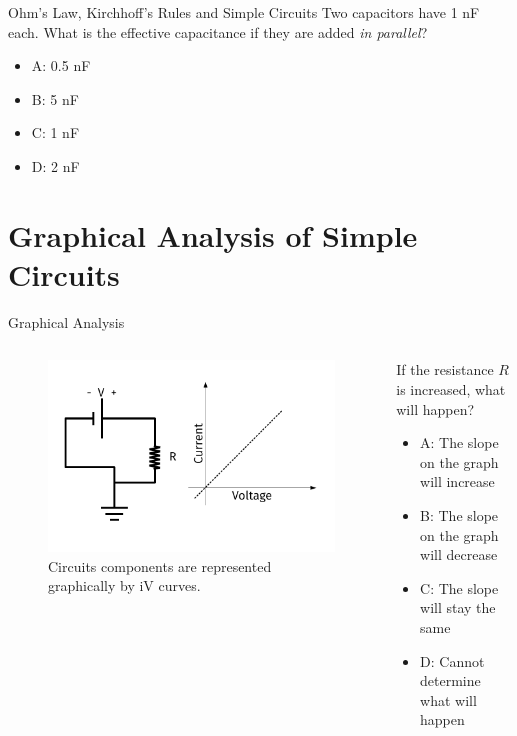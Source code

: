 \documentclass{beamer}
\begin{document}
\begin{frame}{Ohm's Law, Kirchhoff's Rules and Simple Circuits}
Two capacitors have 1 nF each.  What is the effective capacitance if they are added \textit{in parallel}?
\begin{itemize}
\item A: 0.5 nF
\item B: 5 nF
\item C: 1 nF
\item D: 2 nF
\end{itemize}
\end{frame}

\section{Graphical Analysis of Simple Circuits}

\begin{frame}{Graphical Analysis}
\begin{columns}[T]
\begin{column}{0.5\textwidth}
\begin{figure}
\centering
\includegraphics[width=\textwidth,trim=0.5cm 0cm 1cm 0cm,clip=true]{figures/iVCurve.pdf}
\caption{\label{fig:iVCurve1} Circuits components are represented graphically by iV curves.}
\end{figure}
\end{column}
\begin{column}{0.5\textwidth}
\small
If the resistance $R$ is increased, what will happen?
\begin{itemize}
\item A: The slope on the graph will increase
\item B: The slope on the graph will decrease
\item C: The slope will stay the same
\item D: Cannot determine what will happen
\end{itemize}
\end{column}
\end{columns}
\end{frame}
\end{document}

